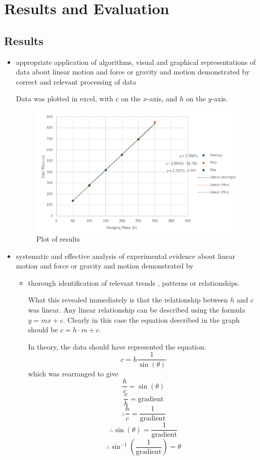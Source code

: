 \documentclass[12pt,a4paper]{article}
\begin{document}
\section{Results and Evaluation}
\subsection{Results}
\begin{itemize}
\item  appropriate application of algorithms, visual and graphical representations of data about linear motion and force or gravity and motion
demonstrated by correct and relevant processing of data



Data was plotted in excel, with $c$ on the $x$-axis, and  $h$ on the $y$-axis.
\begin{figure}[h]
	\centering
\includegraphics[width=0.8\paperwidth]{results.png}
\caption{Plot of results}
\end{figure}



\item systematic and effective analysis of experimental evidence about linear motion and force or gravity and motion demonstrated by
\begin{itemize}
	\item thorough identification of relevant trends , patterns or relationships.

What this revealed immediately is that the relationship between $h$ and $c$ was linear. Any linear relationship can be described using the formula $y=mx+c$. Clearly in this case the equation described in the graph should be $c=h\cdot m + c$.

	In theory, the data should have represented the equation:
	$$c=h\frac{1}{\sin(\theta)}$$
	which was rearranged to give 
	$$\frac{h}{c}=\sin{(\theta)}$$
	$$\frac{c}{h}=\mathrm{gradient}$$
	$$\therefore \frac{h}{c}=\frac{1}{\mathrm{gradient}}$$
	$$\therefore \sin(\theta)=\frac{1}{\textrm{gradient}}$$
	$$\therefore \sin^{-1}\left(\frac{1}{
		\textrm{gradient}}\right)=\theta$$
	

\end{itemize}
\end{itemize}
\end{document}

